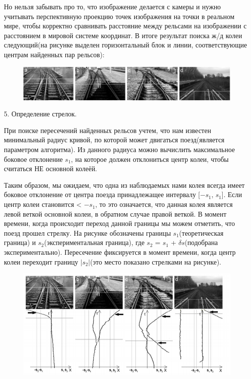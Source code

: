 Но нельзя забывать про то, что изображение делается с камеры и нужно учитывать перспективную проекцию \cite{b:projection} точек изображения на точки в реальном мире, чтобы корректно сравнивать расстояние между рельсами на изображении с расстоянием в мировой системе координат.
\newpage
В итоге результат поиска ж/д колеи следующий(на рисунке выделен горизонтальный блок и линии, соответствующие центрам найденных пар рельсов):
\begin{figure}[!h]
	\centering
	\includegraphics[width=1\linewidth,height=0.5\linewidth]{pictures/screenshot006}
	\caption{}
	\label{fig:screenshot006}
\end{figure}

5. Определение стрелок.

При поиске пересечений найденных рельсов учтем, что нам известен минимальный радиус
кривой, по которой может двигаться поезд(является параметром алгоритма). Из данного радиуса можно вычислить максимальное боковое отклонение $s_1$, на которое должен отклониться центр колеи, чтобы считаться НЕ основной колеёй. 

Таким образом, мы ожидаем, что одна из наблюдаемых нами колея всегда имеет боковое отклонение от центра поезда принадлежащее интервалу [$-s_1$, $s_1$].
Если центр колеи становится < $-s_1$, то это означается, что данная колея является левой веткой основной колеи, в обратном случае правой веткой. В момент времени, когда
происходит переход данной границы мы можем отметить, что поезд прошел стрелку.
\newpage
На рисунке обозначены границы $s_1$(теоретическая граница) и $s_2$(экспериментальная граница), где $s_2$ = $s_1$ + $\delta s$(подобрана экспериментально). Пересечение фиксируется в момент времени, когда центр колеи переходит границу $|s_2|$(это место показано стрелками на рисунке).
\begin{figure}[!h]
	\centering
	\includegraphics[width=1\linewidth]{pictures/screenshot008}
	\caption{}
	\label{fig:screenshot008}
\end{figure}

